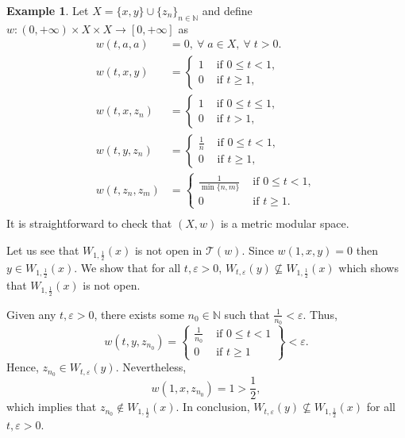 \documentclass[11pt,a4paper]{amsart}
\theoremstyle{definition}
\newtheorem{example}[theorem]{Example}
\begin{document}
	
	\begin{example}
		Let $X=\{x,y\}\cup\{z_n\}_{n\in\mathbb{N}}$ and define $w:(0,+\infty)\times X\times X\to[0,+\infty]$ as
		\begin{align*}
			w(t,a,a)&=0,\ \forall\; a\in X,\ \forall\; t>0.\\
			w(t,x,y)&=\begin{cases}
				1 &\text{ if } 0\leq t<1,\\
				0 &\text{ if } t\geq1,
			\end{cases}\\
			w(t,x,z_n)&=\begin{cases}
				1 &\text{ if } 0\leq t\leq1,\\
				0 &\text{ if } t>1,
			\end{cases}\\
			w(t,y,z_n)&=\begin{cases}
				\frac{1}{n} &\text{ if } 0\leq t<1,\\
				0 &\text{ if } t\geq1,
			\end{cases}\\
			w(t,z_n,z_m)&=\begin{cases}
				\frac{1}{\min\{n, m\}} &\text{ if } 0\leq t<1,\\
				0 &\text{ if } t\geq 1.
			\end{cases}\\
		\end{align*}
		It is straightforward to check that $(X,w)$ is a metric modular space.
		
		Let us see that $W_{1,\frac{1}{2}}(x)$ is not open in $\mathcal{T}(w).$ Since $w(1,x,y)=0$ then  $y\in W_{1,\frac{1}{2}}(x).$ We show that for all $t,\varepsilon>0$, $W_{t,\varepsilon}(y)\nsubseteq W_{1,\frac{1}{2}}(x)$ which shows that $W_{1,\frac{1}{2}}(x)$ is not open.
		
		
		Given any $t,\varepsilon>0$, there exists some $n_0\in\mathbb{N}$ such that $\frac{1}{n_0}<\varepsilon$. Thus,
		\[w(t,y,z_{n_0})=\left\{\begin{array}{ll}
			\frac{1}{n_0} &\text{ if }  0\leq t<1\\
			0 &\text{ if }  t\geq1
		\end{array}\right\}<\varepsilon.\]
		Hence, $z_{n_0}\in W_{t,\varepsilon}(y).$ Nevertheless,
		\[w(1,x,z_{n_0})=1>\frac{1}{2},\]
		which implies that $z_{n_0}\notin W_{1,\frac{1}{2}}(x)$. In conclusion, $W_{t,\varepsilon}(y)\nsubseteq W_{1,\frac{1}{2}}(x)$ for all $t,\varepsilon>0$.
	\end{example}
	
\end{document}
